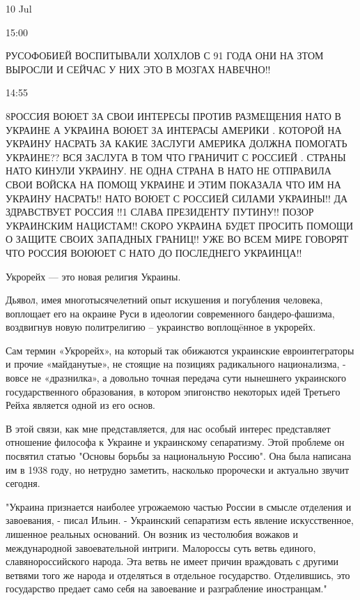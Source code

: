 10 Jul


15:00

РУСОФОБИЕЙ ВОСПИТЫВАЛИ ХОЛХЛОВ С 91 ГОДА ОНИ НА ЗТОМ ВЫРОСЛИ И СЕЙЧАС У НИХ ЭТО В МОЗГАХ НАВЕЧНО!!

14:55

8РОССИЯ ВОЮЕТ ЗА СВОИ ИНТЕРЕСЫ ПРОТИВ РАЗМЕЩЕНИЯ НАТО В УКРАИНЕ А УКРАИНА ВОЮЕТ
ЗА ИНТЕРАСЫ АМЕРИКИ . КОТОРОЙ НА УКРАИНУ НАСРАТЬ ЗА КАКИЕ ЗАСЛУГИ АМЕРИКА
ДОЛЖНА ПОМОГАТЬ УКРАИНЕ?? ВСЯ ЗАСЛУГА В ТОМ ЧТО ГРАНИЧИТ С РОССИЕЙ . СТРАНЫ
НАТО КИНУЛИ УКРАИНУ. НЕ ОДНА СТРАНА В НАТО НЕ ОТПРАВИЛА СВОИ ВОЙСКА НА ПОМОЩ
УКРАИНЕ И ЭТИМ ПОКАЗАЛА ЧТО ИМ НА УКРАИНУ НАСРАТЬ!! НАТО ВОЮЕТ С РОССИЕЙ СИЛАМИ
УКРАИНЫ!! ДА ЗДРАВСТВУЕТ РОССИЯ !!1 СЛАВА ПРЕЗИДЕНТУ ПУТИНУ!! ПОЗОР УКРАИНСКИМ
НАЦИСТАМ!!  СКОРО УКРАИНА БУДЕТ ПРОСИТЬ ПОМОЩИ О ЗАЩИТЕ СВОИХ ЗАПАДНЫХ ГРАНИЦ!!
УЖЕ ВО ВСЕМ МИРЕ ГОВОРЯТ ЧТО РОССИЯ ВОЮЮЕТ С НАТО ДО ПОСЛЕДНЕГО УКРАИНЦА!!


Укрорейх — это новая религия Украины. 

Дьявол, имея многотысячелетний опыт искушения и погубления человека, воплощает
его на окраине Руси в идеологии современного бандеро-фашизма, воздвигнув новую
политрелигию – украинство воплощëнное в укрорейх. 

Сам термин «Укрорейх», на который так обижаются украинские евроинтеграторы и
прочие «майданутые», не стоящие на позициях радикального национализма, - вовсе
не «дразнилка», а довольно точная передача сути нынешнего украинского
государственного образования, в котором эпигонство некоторых идей Третьего
Рейха является одной из его основ.


В этой связи, как мне представляется, для нас особый интерес представляет
отношение философа к Украине и украинскому сепаратизму. Этой проблеме он
посвятил статью "Основы борьбы за национальную Россию". Она была написана им в
1938 году, но нетрудно заметить, насколько пророчески и актуально звучит
сегодня.

"Украина признается наиболее угрожаемою частью России в смысле отделения и
завоевания, - писал Ильин. - Украинский сепаратизм есть явление искусственное,
лишенное реальных оснований. Он возник из честолюбия вожаков и международной
завоевательной интриги. Малороссы суть ветвь единого, славянороссийского
народа. Эта ветвь не имеет причин враждовать с другими ветвями того же народа и
отделяться в отдельное государство. Отделившись, это государство предает само
себя на завоевание и разграбление иностранцам."

